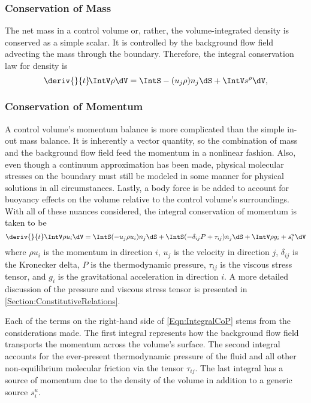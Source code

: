 \subsubsection{Conservation of Mass}
The net mass in a control volume or, rather, the volume-integrated density is conserved as a simple scalar.
It is controlled by the background flow field advecting the mass through the boundary.
Therefore, the integral conservation law for density is
\begin{equation}
    \deriv{}{t}\!\IntV \rho \dV = \IntS -(u_j \rho)n_j\dS + \IntV s^\rho\dV,
\end{equation}


\subsubsection{Conservation of Momentum}
A control volume's momentum balance is more complicated than the simple in-out mass balance.
It is inherently a vector quantity, so the combination of mass and the background flow field feed the momentum in a nonlinear fashion.
Also, even though a continuum approximation has been made, physical molecular stresses on the boundary must still be modeled in some manner for physical solutions in all circumstances.
Lastly, a body force is be added to account for buoyancy effects on the volume relative to the control volume's surroundings.
With all of these nuances considered, the integral conservation of momentum is taken to be
\begin{equation}
    \deriv{}{t} \IntV \rho u_i \dV = \IntS (-u_j \rho u_i) n_j \dS + \IntS (-\delta_{ij} P + \tau_{ij}) n_j \dS + \IntV \rho g_i + s^u_i \dV
    \label{Eqn:IntegralCoP}
\end{equation}
where $\rho{u_i}$ is the momentum in direction $i$, $u_j$ is the velocity in direction $j$, $\delta_{ij}$ is the Kronecker delta, $P$ is the thermodynamic pressure, $\tau_{ij}$ is the viscous stress tensor, and $g_i$ is the gravitational acceleration in direction $i$.
A more detailed discussion of the pressure and viscous stress tensor is presented in \cref{Section:ConstitutiveRelations}.

Each of the terms on the right-hand side of \cref{Eqn:IntegralCoP} stems from the considerations made.
The first integral represents how the background flow field transports the momentum across the volume's surface.
The second integral accounts for the ever-present thermodynamic pressure of the fluid and all other non-equilibrium molecular friction via the tensor $\tau_{ij}$.
The last integral has a source of momentum due to the density of the volume in addition to a generic source $s^u_i$.



